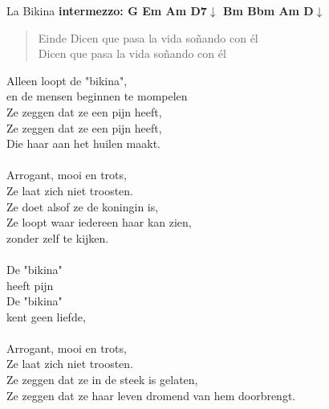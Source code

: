 \begin{song}[joropo]{La Bikina}
\textbf{intermezzo: G Em Am D7$\downarrow$ Bm Bbm Am D$\downarrow$}\\


\begin{verse}{Einde}
Dicen que pasa la vida soñando con él\\
Dicen que pasa la vida soñando con él \\
\end{verse}

\end{song}

\begin{translation}
Alleen loopt de "bikina",\\
en de mensen beginnen te mompelen\\
Ze zeggen dat ze een pijn heeft,\\
Ze zeggen dat ze een pijn heeft,\\
Die haar aan het huilen maakt.\\
\\
Arrogant, mooi en trots,\\
Ze laat zich niet troosten.\\
Ze doet alsof ze de koningin is,\\
Ze loopt waar iedereen haar kan zien,\\
zonder zelf te kijken.\\
\\
De "bikina"\\
heeft pijn\\
De "bikina"\\
kent geen liefde,\\
\\
Arrogant, mooi en trots,\\
Ze laat zich niet troosten.\\
Ze zeggen dat ze in de steek is gelaten,\\
Ze zeggen dat ze haar leven dromend van hem doorbrengt.\\
\end{translation}

